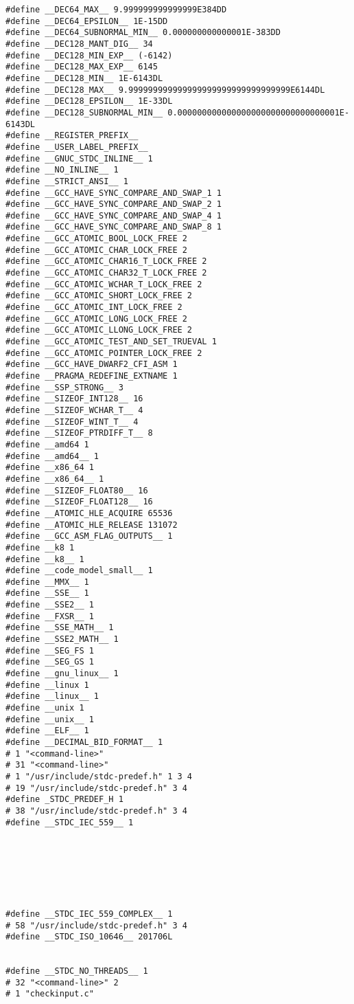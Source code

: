 \documentclass[11pt]{article}
\begin{document}
\begin{enumerate}
\begin{verbatim}
#define __DEC64_MAX__ 9.999999999999999E384DD
#define __DEC64_EPSILON__ 1E-15DD
#define __DEC64_SUBNORMAL_MIN__ 0.000000000000001E-383DD
#define __DEC128_MANT_DIG__ 34
#define __DEC128_MIN_EXP__ (-6142)
#define __DEC128_MAX_EXP__ 6145
#define __DEC128_MIN__ 1E-6143DL
#define __DEC128_MAX__ 9.999999999999999999999999999999999E6144DL
#define __DEC128_EPSILON__ 1E-33DL
#define __DEC128_SUBNORMAL_MIN__ 0.000000000000000000000000000000001E-6143DL
#define __REGISTER_PREFIX__ 
#define __USER_LABEL_PREFIX__ 
#define __GNUC_STDC_INLINE__ 1
#define __NO_INLINE__ 1
#define __STRICT_ANSI__ 1
#define __GCC_HAVE_SYNC_COMPARE_AND_SWAP_1 1
#define __GCC_HAVE_SYNC_COMPARE_AND_SWAP_2 1
#define __GCC_HAVE_SYNC_COMPARE_AND_SWAP_4 1
#define __GCC_HAVE_SYNC_COMPARE_AND_SWAP_8 1
#define __GCC_ATOMIC_BOOL_LOCK_FREE 2
#define __GCC_ATOMIC_CHAR_LOCK_FREE 2
#define __GCC_ATOMIC_CHAR16_T_LOCK_FREE 2
#define __GCC_ATOMIC_CHAR32_T_LOCK_FREE 2
#define __GCC_ATOMIC_WCHAR_T_LOCK_FREE 2
#define __GCC_ATOMIC_SHORT_LOCK_FREE 2
#define __GCC_ATOMIC_INT_LOCK_FREE 2
#define __GCC_ATOMIC_LONG_LOCK_FREE 2
#define __GCC_ATOMIC_LLONG_LOCK_FREE 2
#define __GCC_ATOMIC_TEST_AND_SET_TRUEVAL 1
#define __GCC_ATOMIC_POINTER_LOCK_FREE 2
#define __GCC_HAVE_DWARF2_CFI_ASM 1
#define __PRAGMA_REDEFINE_EXTNAME 1
#define __SSP_STRONG__ 3
#define __SIZEOF_INT128__ 16
#define __SIZEOF_WCHAR_T__ 4
#define __SIZEOF_WINT_T__ 4
#define __SIZEOF_PTRDIFF_T__ 8
#define __amd64 1
#define __amd64__ 1
#define __x86_64 1
#define __x86_64__ 1
#define __SIZEOF_FLOAT80__ 16
#define __SIZEOF_FLOAT128__ 16
#define __ATOMIC_HLE_ACQUIRE 65536
#define __ATOMIC_HLE_RELEASE 131072
#define __GCC_ASM_FLAG_OUTPUTS__ 1
#define __k8 1
#define __k8__ 1
#define __code_model_small__ 1
#define __MMX__ 1
#define __SSE__ 1
#define __SSE2__ 1
#define __FXSR__ 1
#define __SSE_MATH__ 1
#define __SSE2_MATH__ 1
#define __SEG_FS 1
#define __SEG_GS 1
#define __gnu_linux__ 1
#define __linux 1
#define __linux__ 1
#define __unix 1
#define __unix__ 1
#define __ELF__ 1
#define __DECIMAL_BID_FORMAT__ 1
# 1 "<command-line>"
# 31 "<command-line>"
# 1 "/usr/include/stdc-predef.h" 1 3 4
# 19 "/usr/include/stdc-predef.h" 3 4
#define _STDC_PREDEF_H 1
# 38 "/usr/include/stdc-predef.h" 3 4
#define __STDC_IEC_559__ 1







#define __STDC_IEC_559_COMPLEX__ 1
# 58 "/usr/include/stdc-predef.h" 3 4
#define __STDC_ISO_10646__ 201706L


#define __STDC_NO_THREADS__ 1
# 32 "<command-line>" 2
# 1 "checkinput.c"


\end{verbatim}
\end{enumerate}
\end{document}
